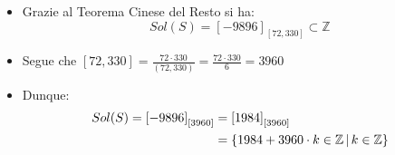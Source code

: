 \documentclass[10pt]{article}
\begin{document}
\begin{itemize}
\begin{itemize}
\begin{enumerate}
	\begin{itemize}
	\item
	Grazie al Teorema Cinese del Resto si ha: $$Sol(S) = \left[-9896\right]_{\left[72,330\right]} \subset \mathbb{Z}$$ \smallskip
	\item
	Segue che $\displaystyle{\left[72,330\right] = \frac{72 \cdot 330}{(72,330)} = \frac{72 \cdot 330}{6} = 3960}$
	\item
	Dunque:
	\begin{equation}
	\begin{split}
	Sol(S) = \left[-9896\right]_{\left[3960\right]} &= \left[1984\right]_{\left[3960\right]} \\
	&= \{1984 + 3960 \cdot k \in \mathbb{Z} \,|\, k \in \mathbb{Z} \}
	\notag
	\end{split}
	\end{equation}
	\end{itemize}
	\end{enumerate}
	\end{itemize}
	\end{itemize}
	
\end{document}
